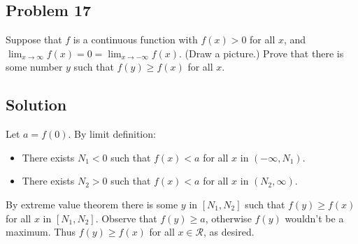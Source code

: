 \subsection*{Problem 17}
Suppose that $f$ is a continuous function with $f(x)>0$ for all $x$,
and $\lim_{x\to\infty} f(x)=0=\lim_{x\to-\infty} f(x)$. (Draw a picture.) Prove that
there is some number $y$ such that $f(y)\geq f(x)$ for all $x$.

\subsection*{Solution}
Let $a=f(0)$. By limit definition:
\begin{itemize}
\item There exists $N_1<0$ such that $f(x)<a$ for all $x$ in $(-\infty, N_1)$.
\item There exists $N_2>0$ such that $f(x)<a$ for all $x$ in $(N_2, \infty)$.
\end{itemize}

By extreme value theorem there is some $y$ in $[N_1, N_2]$ such that
$f(y)\geq f(x)$ for all $x$ in $[N_1, N_2]$. Observe that $f(y)\geq a$,
otherwise $f(y)$ wouldn't be a maximum. Thus $f(y)\ge f(x)$ for all
$x\in\mathcal{R}$, as desired.


